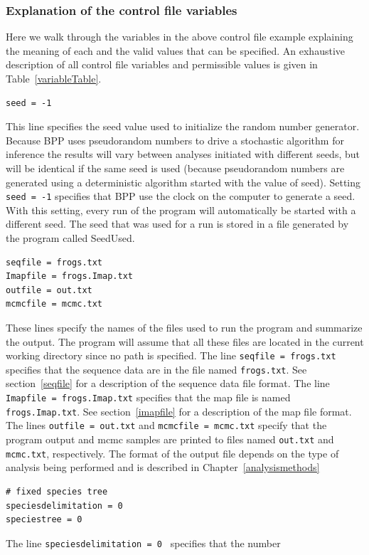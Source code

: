 \documentclass{book}
\numberwithin{equation}{section} \renewcommand{\baselinestretch}{0.55}
\begin{document}
\subsubsection{Explanation of the control file variables}
Here we walk through the variables in the above control file example
explaining the meaning of each and the valid values that can be
specified. An exhaustive description of all control file variables and
permissible values is given in Table~\ref{variableTable}.
\begin{verbatim}
seed = -1
\end{verbatim}
This line specifies the seed value used to initialize the random
number generator. Because BPP uses pseudorandom numbers to drive a
stochastic algorithm for inference the results will vary between
analyses initiated with different seeds, but will be identical if the
same seed is used (because pseudorandom numbers are generated using a
deterministic algorithm started with the value of seed).  Setting
\texttt{seed = -1} specifies that BPP use the clock on the computer to
generate a seed. With this setting, every run of the program will
automatically be started with a different seed. The seed that was used
for a run is stored in a file generated by the program called
SeedUsed.
\begin{verbatim}
seqfile = frogs.txt
Imapfile = frogs.Imap.txt
outfile = out.txt
mcmcfile = mcmc.txt
\end{verbatim}
These lines specify the names of the files used to run the program and
summarize the output.  The program will assume that all these files
are located in the current working directory since no path is
specified. The line \texttt{seqfile = frogs.txt} specifies that the
sequence data are in the file named \texttt{frogs.txt}. See
section~\ref{seqfile} for a description of the sequence data file
format.  The line \texttt{Imapfile = frogs.Imap.txt} specifies that
the map file is named \texttt{frogs.Imap.txt}. See
section~\ref{imapfile} for a description of the map file format.  The
lines \texttt{outfile = out.txt} and \texttt{mcmcfile = mcmc.txt}
specify that the program output and mcmc samples are printed to files
named \texttt{out.txt} and \texttt{mcmc.txt}, respectively.  The
format of the output file depends on the type of analysis being
performed and is described in Chapter~\ref{analysismethods}
\begin{verbatim}
# fixed species tree
speciesdelimitation = 0 
speciestree = 0
\end{verbatim}
The line \texttt{speciesdelimitation = 0 } specifies that the number
\end{document}
